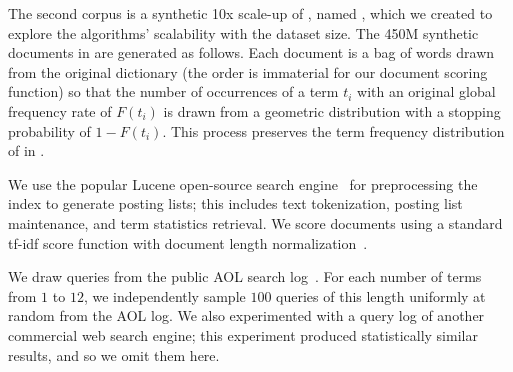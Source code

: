 The second corpus is a synthetic 10x scale-up of \cw, named \cwten, which we created to explore the algorithms' scalability 
with the dataset size. 
The 450M synthetic documents in {\cwten\/} are generated as follows. Each document is a bag of words drawn from the original {\cw\/} dictionary 
(the order is immaterial for our document scoring function) 
so that the number of occurrences of a term $t_i$ with an original 
global frequency rate of $F(t_i)$ is drawn from a geometric distribution with a stopping probability of $1-F(t_i)$. This  process preserves 
the  term frequency distribution of {\cw\/} in \cwten.

 
We use the popular Lucene open-source search engine~\cite{lucene} for preprocessing the index to generate posting lists; this  includes text tokenization, posting list maintenance, 
and term statistics retrieval.
We score documents using a standard tf-idf score function with document length normalization~\cite{Baeza-Yates:1999:MIR:553876}. 

We draw queries from the public AOL search log~\cite{aol}.
For each number of terms from $1$ to $12$, we independently sample $100$ queries of this length uniformly at random from the AOL log.
We also  experimented with a query log of another commercial web search engine; this experiment  
produced statistically similar results, and so we omit them here.  

